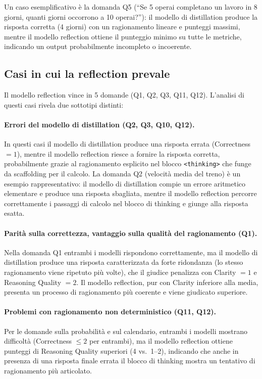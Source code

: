 Un caso esemplificativo è la domanda Q5 (``Se 5 operai completano
un lavoro in 8 giorni, quanti giorni occorrono a 10 operai?''):
il modello di distillation produce la risposta corretta (4 giorni)
con un ragionamento lineare e punteggi massimi, mentre il modello
reflection ottiene il punteggio minimo su tutte le metriche,
indicando un output probabilmente incompleto o incoerente.

\subsection{Casi in cui la reflection prevale}

Il modello reflection vince in 5 domande (Q1, Q2, Q3, Q11, Q12).
L'analisi di questi casi rivela due sottotipi distinti:

\paragraph{Errori del modello di distillation (Q2, Q3, Q10, Q12).}
In questi casi il modello di distillation produce una risposta errata
(Correctness $= 1$), mentre il modello reflection riesce a fornire
la risposta corretta, probabilmente grazie al ragionamento esplicito
nel blocco \texttt{<thinking>} che funge da scaffolding per il
calcolo. La domanda Q2 (velocità media del treno) è un esempio
rappresentativo: il modello di distillation compie un errore
aritmetico elementare e produce una risposta sbagliata, mentre il
modello reflection percorre correttamente i passaggi di calcolo nel
blocco di thinking e giunge alla risposta esatta.

\paragraph{Parità sulla correttezza, vantaggio sulla qualità del ragionamento (Q1).}
Nella domanda Q1 entrambi i modelli rispondono correttamente, ma
il modello di distillation produce una risposta caratterizzata da
forte ridondanza (lo stesso ragionamento viene ripetuto più volte),
che il giudice penalizza con Clarity $= 1$ e Reasoning Quality $= 2$.
Il modello reflection, pur con Clarity inferiore alla media,
presenta un processo di ragionamento più coerente e viene giudicato
superiore.

\paragraph{Problemi con ragionamento non deterministico (Q11, Q12).}
Per le domande sulla probabilità e sul calendario, entrambi i modelli
mostrano difficoltà (Correctness $\leq 2$ per entrambi), ma il modello
reflection ottiene punteggi di Reasoning Quality superiori (4 vs.\ 1--2),
indicando che anche in presenza di una risposta finale errata il
blocco di thinking mostra un tentativo di ragionamento più articolato.

